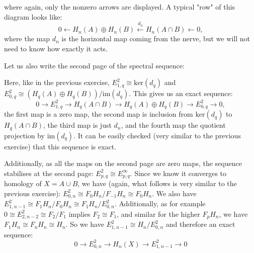 \documentclass{article}
\begin{document}
where again, only the nonzero arrows are displayed.
A typical "{}row"{} of this diagram looks like:
\begin{equation*}
0 \leftarrow H_n(A) \oplus H_n(B) \xleftarrow{d_n} H_n(A \cap B) \leftarrow 0,
\end{equation*}
where the map $d_n$ is the horizontal map coming from the nerve, but we will not need to know how exactly it acts.

Let us also write the second page of the spectral sequence:

\begin{center}\end{center}

Here, like in the previous exercise, $E^2_{1,q} \cong \mathrm{ker}(d_q)$ and $E^2_{0,q} \cong (H_q(A) \oplus H_q(B)) / \mathrm{im}(d_q)$.
This gives us an exact sequence:
\begin{equation*}
0 \to E^2_{1,q} \to H_q(A \cap B) \to H_q(A) \oplus H_q(B) \to E^2_{0,q} \to 0,
\end{equation*}
the first map is a zero map, the second map is inclusion from $\mathrm{ker}(d_q)$ to $H_q(A \cap B)$, the third map is just $d_n$, and the fourth map the quotient projection by $\mathrm{im}(d_q)$. It can be easily checked (very similar to the previous exercise) that this sequence is exact.

Additionally, as all the maps on the second page are zero maps, the sequence stabilises at the second page: $E^2_{p,q} \cong E^\infty_{p,q}$. Since we know it converges to homology of $X=A\cup B$, we have (again, what follows is very similar to the previous exercise): $E^2_{0,n} \cong F_0 H_n/F_{-1} H_n \cong F_0 H_n$. 
We also have $E^2_{1,n-1} \cong F_1 H_n / F_0 H_n \cong F_1 H_n / E^2_{0,n}$. Additionally, as for example $0 \cong E^2_{2,n-2} \cong F_2/F_1$ implies $F_2 \cong F_1$, and similar for the higher $F_p H_n$, we have $F_1 H_n \cong F_n H_n \cong H_n$. So we have $E^2_{1,n-1} \cong H_n / E^2_{0,n}$ and therefore an exact sequence:
\begin{equation*}
0 \to E_{0,n}^2 \to H_n(X) \to E_{1,n-1}^2 \to 0
\end{equation*}
\end{document}
